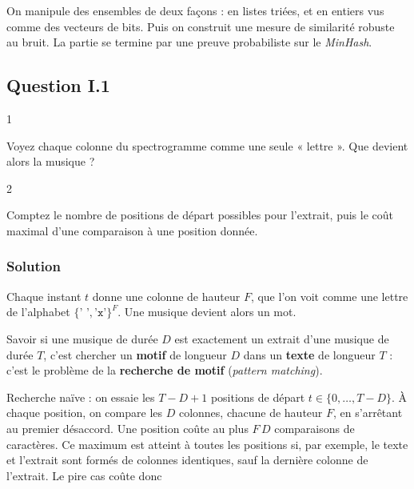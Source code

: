 \documentclass[11pt,a4paper]{article}
\newcommand{\equationajustee}[1]{%
  \sbox{\boiteequation}{$\displaystyle #1$}%
  \ifdim\wd\boiteequation>\linewidth
    \[\resizebox{\linewidth}{!}{\usebox{\boiteequation}}\]%
  \else
    \[#1\]%
  \fi}
\begin{document}
On manipule des ensembles de deux façons : en listes triées, et en entiers vus comme des vecteurs de bits. Puis on construit une mesure de similarité robuste au bruit. La partie se termine par une preuve probabiliste sur le \emph{MinHash}.

\hypertarget{question-i.1}{%
\subsection{Question I.1}\label{question-i.1}}

\begin{indication}{1}

Voyez chaque colonne du spectrogramme comme une seule « lettre ». Que devient alors la musique ?

\end{indication}

\begin{indication}{2}

Comptez le nombre de positions de départ possibles pour l'extrait, puis le coût maximal d'une comparaison à une position donnée.

\end{indication}

\hypertarget{solution}{%
\subsubsection{Solution}\label{solution}}

Chaque instant \(t\) donne une colonne de hauteur \(F\), que l'on voit comme une lettre de l'alphabet \(\{\texttt{' '},\texttt{'x'}\}^F\). Une musique devient alors un mot.

Savoir si une musique de durée \(D\) est exactement un extrait d'une musique de durée \(T\), c'est chercher un \textbf{motif} de longueur \(D\) dans un \textbf{texte} de longueur \(T\) : c'est le problème de la \textbf{recherche de motif} (\emph{pattern matching}).

Recherche naïve : on essaie les \(T-D+1\) positions de départ \(t\in\{0,\dots,T-D\}\). À chaque position, on compare les \(D\) colonnes, chacune de hauteur \(F\), en s'arrêtant au premier désaccord. Une position coûte au plus \(F\,D\) comparaisons de caractères. Ce maximum est atteint à toutes les positions si, par exemple, le texte et l'extrait sont formés de colonnes identiques, sauf la dernière colonne de l'extrait. Le pire cas coûte donc

\equationajustee{\boxed{O\big(F\,D\,(T-D+1)\big)},}
\end{document}
